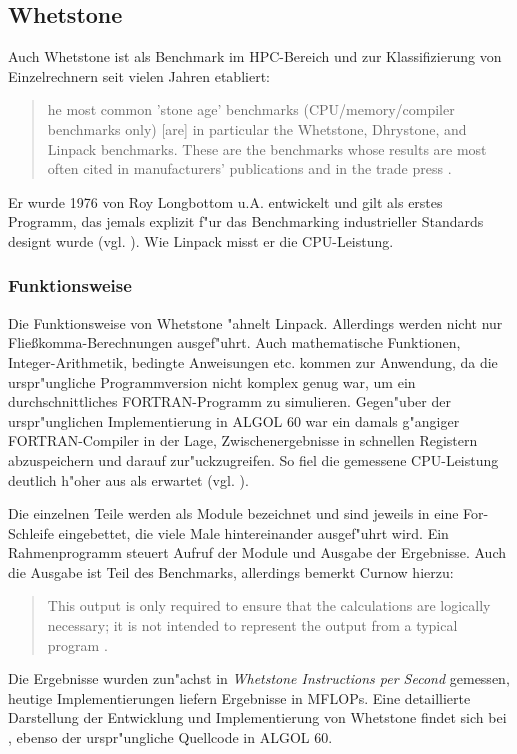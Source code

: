 \subsection{Whetstone}\label{Whetstone}

Auch Whetstone ist als Benchmark im HPC-Bereich und zur Klassifizierung von Einzelrechnern seit vielen Jahren etabliert:
\begin{quote}
\onehalfspacing
[T]he most common 'stone age' benchmarks (CPU/memory/compiler benchmarks only) [are] in particular the Whetstone, Dhrystone, and Linpack benchmarks. These are the benchmarks whose results are most often cited in manufacturers' publications and in the trade press \cite{wei90}.
\end{quote}
Er wurde 1976 von Roy Longbottom u.A. entwickelt und gilt als erstes Programm, das jemals explizit f"ur das Benchmarking industrieller Standards designt wurde (vgl. \cite{wei90}). Wie Linpack misst er die CPU-Leistung. 

\subsubsection{Funktionsweise}\label{Funktion-Whetstone}

Die Funktionsweise von Whetstone "ahnelt Linpack. Allerdings werden nicht nur Flie\ss komma-Berechnungen ausgef"uhrt. Auch mathematische Funktionen, Integer-Arithmetik, bedingte Anweisungen etc. kommen zur Anwendung, da die urspr"ungliche Programmversion nicht komplex genug war, um ein durchschnittliches FORTRAN-Programm zu simulieren. Gegen"uber der urspr"unglichen Implementierung in ALGOL 60 war ein damals g"angiger FORTRAN-Compiler in der Lage, Zwischenergebnisse in schnellen Registern abzuspeichern und darauf zur"uckzugreifen. So fiel die gemessene CPU-Leistung deutlich h"oher aus als erwartet (vgl. \cite{cur76}). 

Die einzelnen Teile werden als Module bezeichnet und sind jeweils in eine For-Schleife eingebettet, die viele Male  hintereinander ausgef"uhrt wird. Ein Rahmenprogramm steuert Aufruf der Module und Ausgabe der Ergebnisse. Auch die Ausgabe ist Teil des Benchmarks, allerdings bemerkt Curnow hierzu: 
\begin{quote}
\onehalfspacing
This output is only required to ensure that the calculations are logically necessary; it is not intended to represent the output from a typical program \cite{cur76}. 
\end{quote}
Die Ergebnisse wurden zun"achst in \textit{Whetstone Instructions per Second} gemessen, heutige Implementierungen liefern Ergebnisse in MFLOPs. Eine detaillierte Darstellung der Entwicklung und Implementierung von Whetstone findet sich bei \cite{cur76}, ebenso der urspr"ungliche Quellcode in ALGOL 60. 

